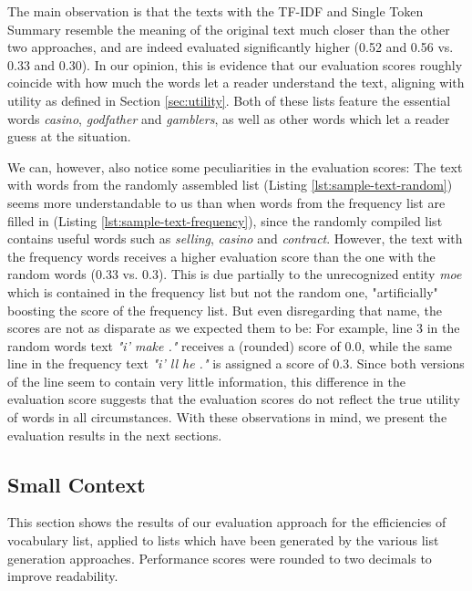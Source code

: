 

The main observation is that the texts with the TF-IDF and Single Token Summary resemble the meaning of the original text much closer than the other two approaches, and are indeed evaluated significantly higher (0.52 and 0.56 vs. 0.33 and 0.30).
In our opinion, this is evidence that our evaluation scores roughly coincide with how much the words let a reader understand the text, aligning with utility as defined in Section \ref{sec:utility}.
Both of these lists feature the essential words \textit{casino}, \textit{godfather} and \textit{gamblers}, as well as other words which let a reader guess at the situation.

We can, however, also notice some peculiarities in the evaluation scores:
The text with words from the randomly assembled list (Listing \ref{lst:sample-text-random}) seems more understandable to us than when words from the  frequency list are filled in (Listing \ref{lst:sample-text-frequency}), since the randomly compiled list contains useful words such as \textit{selling}, \textit{casino} and \textit{contract}.
However, the text with the frequency words receives a higher evaluation score than the one with the random words (0.33 vs. 0.3).
This is due partially to the unrecognized entity \textit{moe} which is contained in the frequency list but not the random one, "artificially" boosting the score of the frequency list.
But even disregarding that name, the scores are not as disparate as we expected them to be:
For example, line 3 in the random words text \textit{"i' make       ."} receives a (rounded) score of 0.0, while the same line in the frequency text \textit{"i' ll      he      ."} is assigned a score of 0.3.
Since both versions of the line seem to contain very little information, this difference in the evaluation score suggests that the evaluation scores do not reflect the true utility of words in all circumstances.
With these observations in mind, we present the evaluation results in the next sections.

\subsection{Small Context} \label{sec:results-small-context}
This section shows the results of our evaluation approach for the efficiencies of vocabulary list, applied to lists which have been generated by the various list generation approaches.
Performance scores were rounded to two decimals to improve readability.


